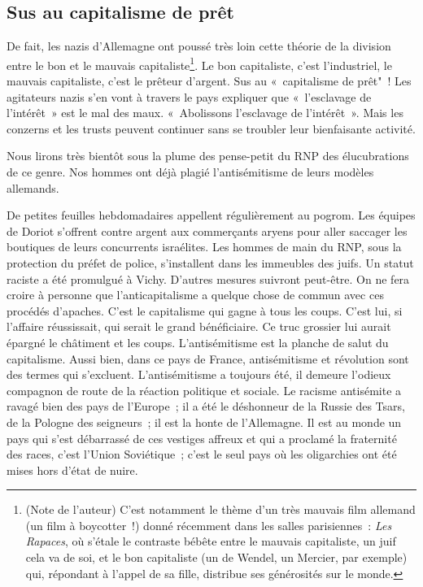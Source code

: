 \documentclass[french,twoside]{book} %
\begin{document}
\subsection[Sus au capitalisme de prêt]{Sus au capitalisme de prêt}
\noindent De fait, les nazis d’Allemagne ont poussé très loin cette théorie de la division entre le bon et le mauvais capitaliste\footnote{(Note de l’auteur) C’est notamment le thème d’un très mauvais film allemand (un film à boycotter !) donné récemment dans les salles parisiennes : \emph{Les Rapaces}, où s’étale le contraste bébête entre le mauvais capitaliste, un juif cela va de soi, et le bon capitaliste (un de Wendel, un Mercier, par exemple) qui, répondant à l’appel de sa fille, distribue ses générosités sur le monde.}. Le bon capitaliste, c’est l’industriel, le mauvais capitaliste, c’est le prêteur d’argent. Sus au « capitalisme de prêt" ! Les agitateurs nazis s’en vont à travers le pays expliquer que « l’esclavage de l’intérêt » est le mal des maux. « Abolissons l’esclavage de l’intérêt ». Mais les conzerns et les trusts peuvent continuer sans se troubler leur bienfaisante activité.\par
Nous lirons très bientôt sous la plume des pense-petit du RNP des élucubrations de ce genre. Nos hommes ont déjà plagié l’antisémitisme de leurs modèles allemands.\par
De petites feuilles hebdomadaires appellent régulièrement au pogrom. Les équipes de Doriot s’offrent contre argent aux commerçants aryens pour aller saccager les boutiques de leurs concurrents israélites. Les hommes de main du RNP, sous la protection du préfet de police, s’installent dans les immeubles des juifs. Un statut raciste a été promulgué à Vichy. D’autres mesures suivront peut-être. On ne fera croire à personne que l’anticapitalisme a quelque chose de commun avec ces procédés d’apaches. C’est le capitalisme qui gagne à tous les coups. C’est lui, si l’affaire réussissait, qui serait le grand bénéficiaire. Ce truc grossier lui aurait épargné le châtiment et les coups. L’antisémitisme est la planche de salut du capitalisme. Aussi bien, dans ce pays de France, antisémitisme et révolution sont des termes qui s’excluent. L’antisémitisme a toujours été, il demeure l’odieux compagnon de route de la réaction politique et sociale. Le racisme antisémite a ravagé bien des pays de l’Europe ; il a été le déshonneur de la Russie des Tsars, de la Pologne des seigneurs ; il est la honte de l’Allemagne. Il est au monde un pays qui s’est débarrassé de ces vestiges affreux et qui a proclamé la fraternité des races, c’est l’Union Soviétique ; c’est le seul pays où les oligarchies ont été mises hors d’état de nuire.
\end{document}
